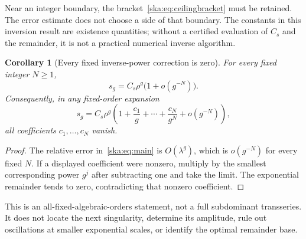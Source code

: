 \documentclass[11pt,letterpaper]{article}
\newtheorem{corollary}[theorem]{Corollary}
\theoremstyle{definition}
\begin{document}
Near an integer boundary, the bracket~\eqref{ska:eq:ceilingbracket} must be retained. The error estimate does not choose a side of that boundary. The constants in this inversion result are existence quantities; without a certified evaluation of $C_s$ and the remainder, it is not a practical numerical inverse algorithm.

\begin{corollary}[Every fixed inverse-power correction is zero]\label{ska:cor:allorders}
For every fixed integer $N\ge1$,
\begin{equation}\label{ska:eq:allorders}
s_g=C_s\rho^g\bigl(1+o(g^{-N})\bigr).
\end{equation}
Consequently, in any fixed-order expansion
\[
s_g=C_s\rho^g\left(1+\frac{c_1}{g}+\cdots+
\frac{c_N}{g^N}+o(g^{-N})\right),
\]
all coefficients $c_1,\ldots,c_N$ vanish.
\end{corollary}
\begin{proof}
The relative error in~\eqref{ska:eq:main} is $O(\lambda^g)$, which is $o(g^{-N})$ for every fixed $N$. If a displayed coefficient were nonzero, multiply by the smallest corresponding power $g^j$ after subtracting one and take the limit. The exponential remainder tends to zero, contradicting that nonzero coefficient.
\end{proof}

This is an all-fixed-algebraic-orders statement, not a full subdominant transseries. It does not locate the next singularity, determine its amplitude, rule out oscillations at smaller exponential scales, or identify the optimal remainder base.
\end{document}
